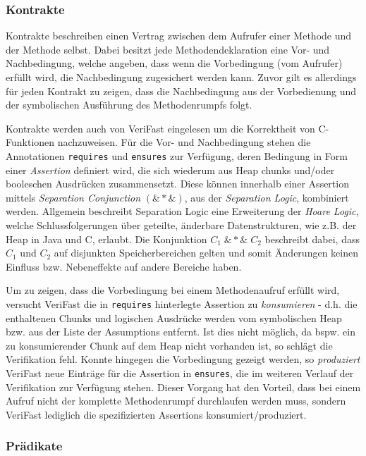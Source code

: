 \subsubsection{Kontrakte}

Kontrakte beschreiben einen Vertrag zwischen dem Aufrufer einer Methode und der Methode selbst. Dabei besitzt jede Methodendeklaration eine Vor- und Nachbedingung, welche angeben, dass wenn die Vorbedingung (vom Aufrufer) erfüllt wird, die Nachbedingung zugesichert werden kann. Zuvor gilt es allerdings für jeden Kontrakt zu zeigen, dass die Nachbedingung aus der Vorbedienung und der symbolischen Ausführung des Methodenrumpfs folgt.

Kontrakte werden auch von VeriFast eingelesen um die Korrektheit von C-Funktionen nachzuweisen. Für die Vor- und Nachbedingung stehen die Annotationen \texttt{requires} und \texttt{ensures} zur Verfügung, deren Bedingung in Form einer \emph{Assertion} definiert wird, die sich wiederum aus Heap chunks und/oder booleschen Ausdrücken zusammensetzt. Diese können innerhalb einer Assertion mittels \emph{Separation Conjunction} $(\&{*}\&)$, aus der \emph{Separation Logic}, kombiniert werden. Allgemein beschreibt Separation Logic eine Erweiterung der \emph{Hoare Logic}, welche Schlussfolgerungen über geteilte, änderbare Datenstrukturen, wie z.B. der Heap in Java und C, erlaubt. Die Konjunktion $C_{1} \; \&{*}\& \; C_{2}$ beschreibt dabei, dass $C_{1}$ und $C_{2}$ auf disjunkten Speicherbereichen gelten und somit Änderungen keinen Einfluss bzw. Nebeneffekte auf andere Bereiche haben. \cite{Reynolds2002}

Um zu zeigen, dass die Vorbedingung bei einem Methodenaufruf erfüllt wird, versucht VeriFast die in \texttt{requires} hinterlegte Assertion zu \emph{konsumieren} - d.h. die enthaltenen Chunks und logischen Ausdrücke werden vom symbolischen Heap bzw. aus der Liste der Assumptions entfernt. Ist dies nicht möglich, da bspw. ein zu konsumierender Chunk auf dem Heap nicht vorhanden ist, so schlägt die Verifikation fehl. Konnte hingegen die Vorbedingung gezeigt werden, so \emph{produziert} VeriFast neue Einträge für die Assertion in \texttt{ensures}, die im weiteren Verlauf der Verifikation zur Verfügung stehen. Dieser Vorgang hat den Vorteil, dass bei einem Aufruf nicht der komplette Methodenrumpf durchlaufen werden muss, sondern VeriFast lediglich die spezifizierten Assertions konsumiert/produziert. \cite{Jacobs2017}

\subsubsection{Prädikate}

